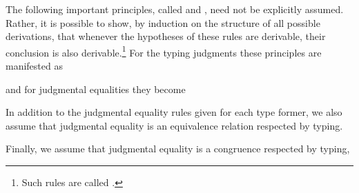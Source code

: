 The following important principles, called 
%
and
,
%
need not be explicitly assumed. Rather, it is possible to
show, by induction on the structure of all possible derivations, that whenever
the hypotheses of these rules are derivable, their conclusion is also
derivable.\footnote{Such rules are called .}
For the typing judgments these principles are manifested as
%
and for judgmental equalities they become
%
In addition to the judgmental equality rules given for each type former, we also
assume that judgmental equality is an equivalence relation respected by typing.
%
Finally, we assume that judgmental equality is a congruence respected by typing,
